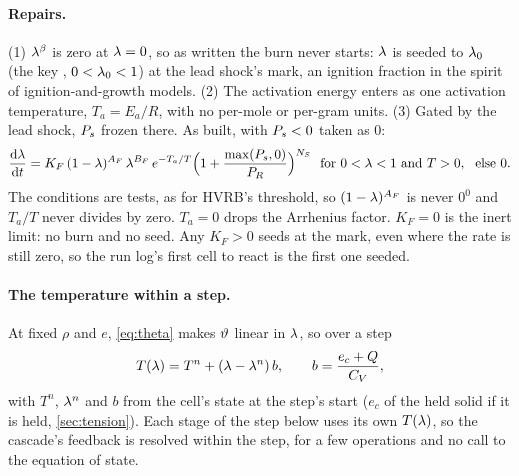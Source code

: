 \paragraph{Repairs.} (1) $\lambda^\beta$ is zero at $\lambda = 0$, so as written
the burn never starts: $\lambda$ is seeded to $\lambda_0$ (the key ,
$0 < \lambda_0 < 1$) at the lead shock's mark, an ignition fraction in the
spirit of ignition-and-growth models. (2) The activation energy enters as one
activation temperature, $T_a = E_a/R$, with no per-mole or per-gram units.
(3) Gated by the lead shock, $P_{s}$ frozen there. As built, with $P_{s} < 0$
taken as 0:
\begin{equation}
  \frac{\mathrm{d}\lambda}{\mathrm{d} t} = K_F\,(1 - \lambda)^{A_F}\,\lambda^{B_F}\,
  e^{-T_a/T}\Bigl(1 + \frac{\max(P_{s}, 0)}{P_R}\Bigr)^{N_S}
  \ \text{ for } 0 < \lambda < 1 \text{ and } T > 0, \ \text{ else } 0.
  \label{eq:ff-rate}
\end{equation}
The conditions are tests, as for HVRB's threshold, so $(1 - \lambda)^{A_F}$ is
never $0^0$ and $T_a/T$ never divides by zero. $T_a = 0$ drops the Arrhenius
factor. $K_F = 0$ is the inert limit: no burn and no seed. Any $K_F > 0$ seeds at
the mark, even where the rate is still zero, so the run log's first cell to
react is the first one seeded.

\paragraph{The temperature within a step.} At fixed $\rho$ and $e$,
\cref{eq:theta} makes $\vartheta$ linear in $\lambda$, so over a step
\begin{equation}
  T(\lambda) = T^n + (\lambda - \lambda^n)\,b, \qquad b = \frac{e_c + Q}{C_{V}},
  \label{eq:ff-T}
\end{equation}
with $T^n$, $\lambda^n$ and $b$ from the cell's state at the step's start ($e_c$
of the held solid if it is held, \cref{sec:tension}). Each stage of the step
below uses its own $T(\lambda)$, so the cascade's feedback is resolved within
the step, for a few operations and no call to the equation of state.

